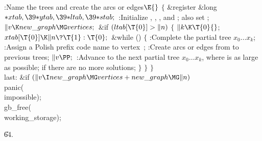 \Y\B\4:Name the trees and create the arcs or edges\X${}\E{}$\6
${}\{{}$\5
\1\&{register} \&{long} ${}{*}\\{xtab},\39{*}\\{ytab},\39{*}\\{ltab},\39{*}%
\\{stab};{}$\7
:Initialize , , , and ;
also set \X;\6
${}\|v\K\\{new\_graph}\MG\\{vertices};{}$\6
\&{if} ${}(\\{ltab}[\T{0}]>\|n){}$\5
${}\{{}$\1\6
${}\|k\K\T{0}{}$;\5
${}\\{xtab}[\T{0}]\K\|n\?\T{1}:\T{0};{}$\6
\&{while} ()\5
${}\{{}$\1\6
:Complete the partial tree $x_0\ldots x_k$\X;\6
:Assign a Polish prefix code name to vertex~\X;\6
:Create arcs or edges from  to previous trees\X;\6
${}\|v\PP;{}$\6
:Advance to the next partial tree $x_0\ldots x_k$, where  is as
large as possible;  if there are no more solutions\X;\6
\4${}\}{}$\2\6
\4${}\}{}$\2\6
\4${}\}{}$\2\6
\4\\{last}:\5
\&{if} ${}(\|v\I\\{new\_graph}\MG\\{vertices}+\\{new\_graph}\MG\|n){}$\1\5
\\{panic}(\\{impossible});\2\6
\\{gb\_free}(\\{working\_storage});\par
\U64.\fi

